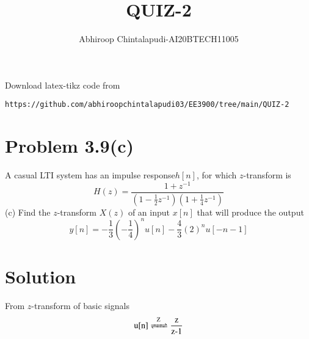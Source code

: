\documentclass[journal,12pt,twocolumn]{IEEEtran}
\begin{document}
     \def\rightbox#1{\makebox[0in][r]{#1}}
     \def\centbox#1{\makebox[0in]{#1}}
     \def\topbox#1{\raisebox{-\baselineskip}[0in][0in]{#1}}
     \def\midbox#1{\raisebox{-0.5\baselineskip}[0in][0in]{#1}}
\vspace{3cm}
\title{QUIZ-2}
\author{Abhiroop Chintalapudi-AI20BTECH11005}
\maketitle
\newpage
\bigskip
\renewcommand{\thefigure}{\theenumi}
\renewcommand{\thetable}{\theenumi}
Download latex-tikz code from  
\begin{lstlisting}
https://github.com/abhiroopchintalapudi03/EE3900/tree/main/QUIZ-2
\end{lstlisting}

\section{Problem 3.9(c)}
A casual LTI system has an impulse response$h[n]$, for which $z$-transform is\\
\begin{equation}
H(z)=\frac{1+z^{-1}}{(1- \frac{1}{2}z^{-1})(1+\frac{1}{4}z^{-1})} \label{eq3.9.1}
\end{equation}
(c) Find the $z$-transform $X(z)$ of an input $x[n]$ that will produce the output\\
\begin{equation}
y[n]=-\frac{1}{3}(-\frac{1}{4})^{n}u[n] - \frac{4}{3}(2)^{n}u[-n-1]  \label{eq3.9.2}
\end{equation}
\section{Solution}
From $z$-transform of basic signals\\
\begin{align}
\ce{u[n] <=>[Z] \frac{z}{z-1}}\\
\end{align}
\end{document}
